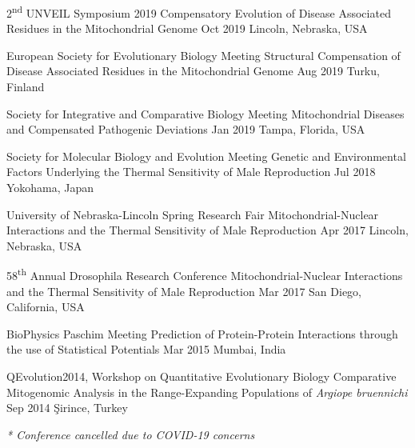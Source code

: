 
\begin{cventries}
 \cvpresentation
    {2\textsuperscript{nd} UNVEIL Symposium 2019}
    {Compensatory Evolution of Disease Associated Residues in the Mitochondrial Genome}
    {Oct 2019}
    {Lincoln, Nebraska, USA} 

  \cvpresentation
    {European Society for Evolutionary Biology Meeting} %
    {Structural Compensation of Disease Associated Residues in the Mitochondrial Genome} %
    {Aug 2019} %
    {Turku, Finland} %
    
  \cvpresentation
    {Society for Integrative and Comparative Biology Meeting}
    {Mitochondrial Diseases and Compensated Pathogenic Deviations}
    {Jan 2019}
    {Tampa, Florida, USA}
    
  \cvpresentation
    {Society for Molecular Biology and Evolution Meeting}
    {Genetic and Environmental Factors Underlying the Thermal Sensitivity of Male Reproduction}
    {Jul 2018}
    {Yokohama, Japan}
    
  \cvpresentation
    {University of Nebraska-Lincoln Spring Research Fair}
    {Mitochondrial-Nuclear Interactions and the Thermal Sensitivity of Male Reproduction}
    {Apr 2017}
    {Lincoln, Nebraska, USA}
    
  \cvpresentation
    {58\textsuperscript{th} Annual Drosophila Research Conference}
    {Mitochondrial-Nuclear Interactions and the Thermal Sensitivity of Male Reproduction}
    {Mar 2017}
    {San Diego, California, USA}
    
   \cvpresentation
    {BioPhysics Paschim Meeting}
    {Prediction of Protein-Protein Interactions through the use of Statistical Potentials}
    {Mar 2015}
    {Mumbai, India}
    
  \cvpresentation
    {QEvolution2014, Workshop on Quantitative Evolutionary Biology}
    {Comparative Mitogenomic Analysis in the Range-Expanding Populations of \textit{Argiope bruennichi}}
    {Sep 2014}
    {\c{S}irince, Turkey}        

\begin{flushleft}
\fontsize{10pt}{1em}\bodyfontlight\itshape\color{graytext} * Conference cancelled due to COVID-19 concerns
\end{flushleft}

\end{cventries}
